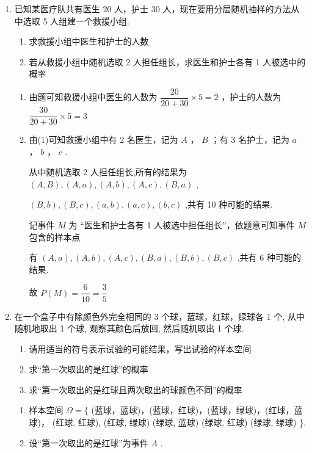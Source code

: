 \begin{enumerate}
\begin{enumerate}
        \item 已知某医疗队共有医生 20 人，护士 30 人，现在要用分层随机抽样的方法从中选取 5 人组建一个救援小组.
        \begin{enumerate}
            \item 求救援小组中医生和护士的人数
            \item 若从救援小组中随机选取 2 人担任组长，求医生和护士各有 1 人被选中的概率
        \end{enumerate}
        \begin{jieda}
            \begin{enumerate}
                \item 由题可知救援小组中医生的人数为 $\dfrac{20}{{20} + {30}} \times  5 = 2$ ，护士的人数为 $\dfrac{30}{{20} + {30}} \times  5 = 3$
                \item 由(1)可知救援小组中有 2 名医生，记为 $A$ ， $B$ ；有 3 名护士，记为 $a$ ， $b$ ， $c$ .
                
                从中随机选取 2 人担任组长,所有的结果为 $\left( {A,B}\right) ,\left( {A,a}\right) ,\left( {A,b}\right) ,\left( {A,c}\right) ,\left( {B,a}\right)$ ,
                
                $\left( {B,b}\right) ,\left( {B,c}\right) ,\left( {a,b}\right) ,\left( {a,c}\right) ,\left( {b,c}\right)$ ,共有 10 种可能的结果.
                
                记事件 $M$ 为 “医生和护士各有 1 人被选中担任组长”，依题意可知事件 $M$ 包含的样本点
                
                有 $\left( {A,a}\right) ,\left( {A,b}\right) ,\left( {A,c}\right) ,\left( {B,a}\right) ,\left( {B,b}\right) ,\left( {B,c}\right)$ ,共有 6 种可能的结果.
                
                故 $P\left( M\right)  = \dfrac{6}{10} = \dfrac{3}{5}$
            \end{enumerate}
        \end{jieda}
        
        \item 在一个盒子中有除颜色外完全相同的 3 个球，蓝球，红球，绿球各 1 个, 从中随机地取出 1 个球, 观察其颜色后放回, 然后随机取出 1 个球.
        \begin{enumerate}
            \item 请用适当的符号表示试验的可能结果，写出试验的样本空间
            \item 求“第一次取出的是红球”的概率
            \item 求“第一次取出的是红球且两次取出的球颜色不同”的概率
        \end{enumerate}
        \begin{jieda}
            \begin{enumerate}
                \item 样本空间 $\Omega  = \{$ (蓝球，蓝球)，(蓝球，红球)，(蓝球，绿球)，(红球，蓝球)， (红球, 红球), (红球, 绿球) (绿球, 蓝球) (绿球, 红球) (绿球, 绿球) \}.
                \item 设“第一次取出的是红球”为事件 $A$ .
                

\end{enumerate}
\end{jieda}
\end{enumerate}
\end{enumerate}
